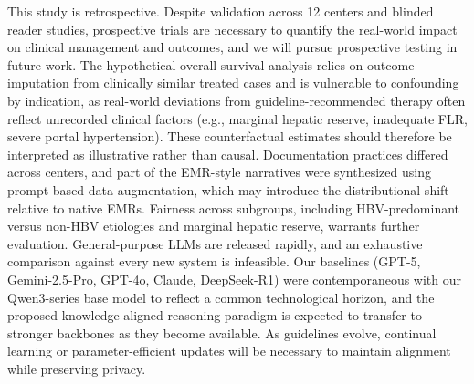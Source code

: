 \documentclass{article}
\begin{document}
This study is retrospective. Despite validation across 12 centers and blinded reader studies, prospective trials are necessary to quantify the real-world impact on clinical management and outcomes, and we will pursue prospective testing in future work. The hypothetical overall-survival analysis relies on outcome imputation from clinically similar treated cases and is vulnerable to confounding by indication, as real-world deviations from guideline-recommended therapy often reflect unrecorded clinical factors (e.g., marginal hepatic reserve, inadequate FLR, severe portal hypertension). These counterfactual estimates should therefore be interpreted as illustrative rather than causal. Documentation practices differed across centers, and part of the EMR-style narratives were synthesized using prompt-based data augmentation, which may introduce the distributional shift relative to native EMRs. Fairness across subgroups, including HBV-predominant versus non-HBV etiologies and marginal hepatic reserve, warrants further evaluation. General-purpose LLMs are released rapidly, and an exhaustive comparison against every new system is infeasible. Our baselines (GPT-5, Gemini-2.5-Pro, GPT-4o, Claude, DeepSeek-R1) were contemporaneous with our Qwen3-series base model to reflect a common technological horizon, and the proposed knowledge-aligned reasoning paradigm is expected to transfer to stronger backbones as they become available. As guidelines evolve, continual learning or parameter-efficient updates will be necessary to maintain alignment while preserving privacy. 
\end{document}

